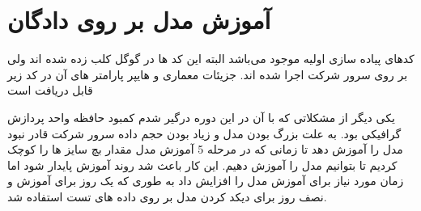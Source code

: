 \section{آموزش مدل بر روی دادگان}

کدهای پیاده سازی اولیه موجود می‌باشد البته این کد ها در گوگل کلب زده شده اند ولی بر روی سرور شرکت اجرا شده اند. جزیئات معماری و هایپر پارامتر های آن در کد زیر قابل دریافت است 

یکی دیگر از مشکلاتی که با آن در این دوره درگیر شدم کمبود حافظه واحد پردازش گرافیکی بود. به علت بزرگ بودن مدل و زیاد بودن حجم داده سرور شرکت قادر نبود مدل را آموزش دهد تا زمانی که در مرحله 5 آموزش مدل مقدار بچ سایز ها را کوچک کردیم تا بتوانیم مدل را آموزش دهیم. این کار باعث شد روند آموزش پایدار شود اما زمان مورد نیاز برای آموزش مدل را افزایش داد به طوری که یک روز برای آموزش و نصف روز برای دیکد کردن مدل بر روی داده های تست استفاده شد.

